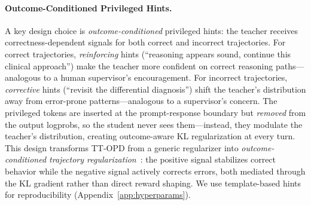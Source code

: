 \documentclass{article}
\begin{document}
\paragraph{Outcome-Conditioned Privileged Hints.}
A key design choice is \emph{outcome-conditioned} privileged hints: the teacher receives correctness-dependent signals for both correct and incorrect trajectories. For correct trajectories, \emph{reinforcing} hints (``reasoning appears sound, continue this clinical approach'') make the teacher more confident on correct reasoning paths---analogous to a human supervisor's encouragement. For incorrect trajectories, \emph{corrective} hints (``revisit the differential diagnosis'') shift the teacher's distribution away from error-prone patterns---analogous to a supervisor's concern. The privileged tokens are inserted at the prompt-response boundary but \emph{removed} from the output logprobs, so the student never sees them---instead, they modulate the teacher's distribution, creating outcome-aware KL regularization at every turn. This design transforms TT-OPD from a generic regularizer into \emph{outcome-conditioned trajectory regularization}~\citep{yang26rlsd, li26srpo}: the positive signal stabilizes correct behavior while the negative signal actively corrects errors, both mediated through the KL gradient rather than direct reward shaping. We use template-based hints for reproducibility (Appendix~\ref{app:hyperparams}).
\end{document}
